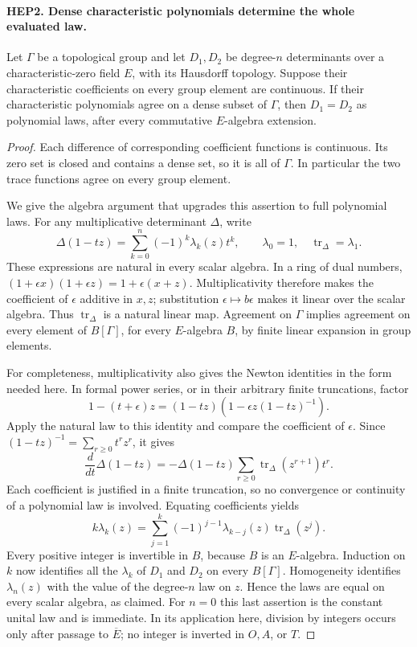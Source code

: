 \documentclass[11pt,a4paper]{article}
\numberwithin{equation}{section}
\theoremstyle{remark}\newtheorem{remark}[theorem]{Remark}
\begin{document}
\paragraph{HEP2. Dense characteristic polynomials determine the whole evaluated law.}
\label{claim:HEP2}
Let $\Gamma$ be a topological group and let $D_1,D_2$ be
degree-$n$ determinants over a characteristic-zero field $E$,
with its Hausdorff topology.  Suppose their characteristic
coefficients on every group element are continuous.  If their
characteristic polynomials agree on a dense subset of $\Gamma$,
then $D_1=D_2$ as polynomial laws, after every commutative
$E$-algebra extension.
\begin{proof}
Each difference of corresponding coefficient functions is continuous.
Its zero set is closed and contains a dense set, so it is all of
$\Gamma$.  In particular the two trace functions agree on every
group element.

We give the algebra argument that upgrades this assertion to full
polynomial laws.  For any multiplicative determinant $\Delta$,
write
\[
 \Delta(1-tz)=\sum_{k=0}^n(-1)^k\lambda_k(z)t^k,
 \qquad \lambda_0=1,\quad \operatorname{tr}_\Delta=\lambda_1.
 \tag{HEP.4}
\]
These expressions are natural in every scalar algebra.  In a ring
of dual numbers,
$(1+\epsilon x)(1+\epsilon z)=1+\epsilon(x+z)$.
Multiplicativity therefore makes the coefficient of $\epsilon$
additive in $x,z$; substitution $\epsilon\mapsto b\epsilon$
makes it linear over the scalar algebra.  Thus
$\operatorname{tr}_\Delta$ is a natural linear map.  Agreement on
$\Gamma$ implies agreement on every element of $B[\Gamma]$, for
every $E$-algebra $B$, by finite linear expansion in group elements.

For completeness, multiplicativity also gives the Newton identities
in the form needed here.  In formal power series, or in their
arbitrary finite truncations, factor
\[
 1-(t+\epsilon)z=(1-tz)
       \left(1-\epsilon z(1-tz)^{-1}\right).
\]
Apply the natural law to this identity and compare the coefficient
of $\epsilon$.  Since $(1-tz)^{-1}=\sum_{r\geq0}t^rz^r$, it gives
\[
 \frac{d}{dt}\Delta(1-tz)
   =-\Delta(1-tz)\sum_{r\geq0}
                        \operatorname{tr}_\Delta(z^{r+1})t^r.
\]
Each coefficient is justified in a finite truncation, so no
convergence or continuity of a polynomial law is involved.
Equating coefficients yields
\[
 k\lambda_k(z)=\sum_{j=1}^k(-1)^{j-1}
                   \lambda_{k-j}(z)\operatorname{tr}_\Delta(z^j).
 \tag{HEP.5}
\]
Every positive integer is invertible in $B$, because $B$ is an
$E$-algebra.  Induction on $k$ now identifies all the $\lambda_k$
of $D_1$ and $D_2$ on every $B[\Gamma]$.  Homogeneity identifies
$\lambda_n(z)$ with the value of the degree-$n$ law on $z$.
Hence the laws are equal on every scalar algebra, as claimed.
For $n=0$ this last assertion is the constant unital law and is
immediate.  In its application here, division by integers occurs
only after passage to $\overline E$; no integer is inverted in
$O,A$, or $T$.
\end{proof}
\end{document}
